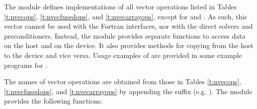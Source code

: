 The {\nveccuda} module defines implementations of all vector operations listed
in Tables \ref{t:nvecops}, \ref{t:nvecfusedops}, and \ref{t:nvecarrayops}, except
for  and .
As such, this vector cannot be used with the {\sundials} Fortran interfaces,
nor with the {\sundials} direct solvers and preconditioners. Instead,
the {\nveccuda} module provides separate functions to access data on the host
and on the device. It also provides methods for copying from the host to
the device and vice versa. Usage examples of {\nveccuda} are provided in
some example programs for {\cvode} \cite{cvode_ex}.

The names of vector operations are obtained from those in Tables \ref{t:nvecops},
\ref{t:nvecfusedops}, and \ref{t:nvecarrayops} by appending the suffix 
(e.g. ). The module {\nveccuda} provides the following
functions:
